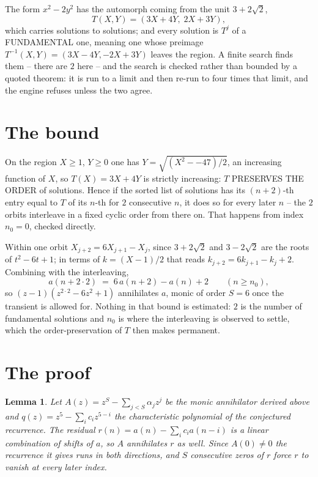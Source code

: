 \documentclass[11pt,a4paper]{article}
\theoremstyle{plain}
\newtheorem{lemma}[theorem]{Lemma}
\theoremstyle{definition}
\begin{document}
The form $x^2-2y^2$ has the automorph coming from the unit $3+2\sqrt2$,
\[
T(X,Y)=(3X+4Y,\;2X+3Y),
\]
which carries solutions to solutions; and every solution is $T^{j}$ of a FUNDAMENTAL one,
meaning one whose preimage $T^{-1}(X,Y)=(3X-4Y,-2X+3Y)$ leaves the region. A finite search
finds them -- there are $2$ here -- and the search is checked rather than bounded by a quoted
theorem: it is run to a limit and then re-run to four times that limit, and the engine refuses
unless the two agree.

\section{The bound}

On the region $X\ge1$, $Y\ge0$ one has $Y=\sqrt{(X^2--47)/2}$, an increasing function of $X$,
so $T(X)=3X+4Y$ is strictly increasing: $T$ PRESERVES THE ORDER of solutions. Hence if the
sorted list of solutions has its $(n+2)$-th entry equal to $T$ of its $n$-th for $2$
consecutive $n$, it does so for every later $n$ -- the $2$ orbits interleave in a fixed cyclic
order from there on. That happens from index $n_0=0$, checked directly.

Within one orbit $X_{j+2}=6X_{j+1}-X_j$, since $3+2\sqrt2$ and $3-2\sqrt2$ are the roots of
$t^2-6t+1$; in terms of $k=(X-1)/2$ that reads $k_{j+2}=6k_{j+1}-k_j+2$. Combining with the
interleaving,
\[
a(n+2\cdot2)\;=\;6\,a(n+2)-a(n)+2 \qquad (n\ge n_0),
\]
so $(z-1)(z^{2\cdot2}-6z^{2}+1)$ annihilates $a$, monic of order $S=6$ once the
transient is allowed for. Nothing in that bound is estimated: $2$ is the number of fundamental
solutions and $n_0$ is where the interleaving is observed to settle, which the order-preservation
of $T$ then makes permanent.

\section{The proof}

\begin{lemma}\label{lem:crit}
Let $A(z)=z^S-\sum_{j<S}\alpha_jz^{j}$ be the monic annihilator derived above and
$q(z)=z^{5}-\sum_ic_iz^{5-i}$ the characteristic polynomial of the conjectured
recurrence. The residual $r(n)=a(n)-\sum_ic_ia(n-i)$ is a linear combination of shifts of $a$,
so $A$ annihilates $r$ as well. Since $A(0)\ne0$ the recurrence it gives runs in both
directions, and $S$ consecutive zeros of $r$ force $r$ to vanish at every later index.
\end{lemma}
\end{document}
